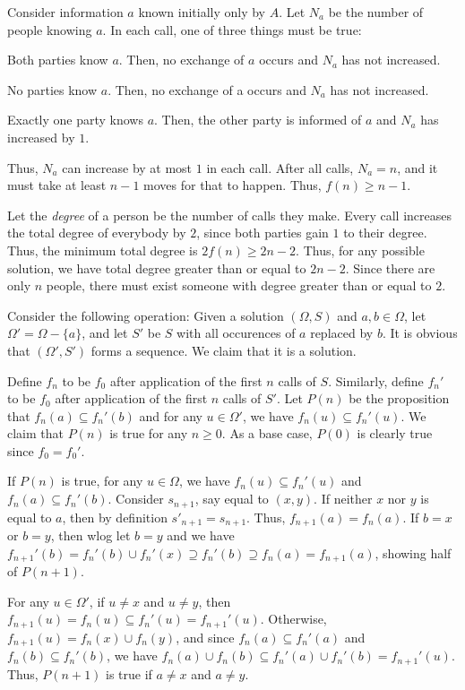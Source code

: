 \documentclass[12pt]{article}
\theoremstyle{customstyle}
\begin{document}
Consider information $a$ known initially only by $A$.
Let $N_a$ be the number of people knowing $a$.
In each call, one of three things must be true:
\begin{compactitem}
\item Both parties know $a$. 
    Then, no exchange of $a$ occurs and $N_a$ has not increased.
\item No parties know $a$. 
    Then, no exchange of a occurs and $N_a$ has not increased.
\item Exactly one party knows $a$.
    Then, the other party is informed of $a$ and $N_a$ has increased by $1$.
\end{compactitem}
Thus, $N_a$ can increase by at most $1$ in each call. 
After all calls, $N_a = n$, and it must take at least $n-1$ moves
for that to happen. Thus, $f(n) \ge n - 1$.

Let the \emph{degree} of a person be the number of calls they make.
Every call increases the total degree of everybody by $2$,
since both parties gain $1$ to their degree.
Thus, the minimum total degree is $2f(n) \ge 2n - 2$.
Thus, for any possible solution,
we have total degree greater than or equal to $2n - 2$.
Since there are only $n$ people, there must exist
someone with degree greater than or equal to $2$.

Consider the following operation: 
Given a solution $(\Omega, S)$ and $a,b \in \Omega$,
let $\Omega' = \Omega - \{a\}$, and
let $S'$ be $S$ with all occurences of $a$ replaced by $b$.
It is obvious that $(\Omega', S')$ forms a sequence.
We claim that it is a solution.

Define $f_n$ to be $f_{0}$ after application
of the first $n$ calls of $S$.
Similarly, define $f_n'$ to be $f_{0}$ after application
of the first $n$ calls of $S'$.
Let $P(n)$ be the proposition that 
$f_n(a) \subseteq f_n'(b)$ and
for any $u \in \Omega'$,
we have $f_n(u) \subseteq f_n'(u)$.
We claim that $P(n)$ is true for any $n \ge 0$.
As a base case, $P(0)$ is clearly true since $f_{0}=f_{0}'$.

If $P(n)$ is true, for any $u \in \Omega$, we have $f_n(u) \subseteq f_n'(u)$ and $f_n(a) \subseteq f_n'(b)$.
Consider $s _{n+1}$, say equal to $(x,y)$.
If neither $x$ nor $y$ is equal to $a$,
then by definition $s'_{n+1} = s_{n+1}$.
Thus, $f_{n+1}(a) = f_n(a)$.
If $b=x$ or $b=y$, then wlog let $b=y$ and we have
$f_{n+1}'(b) = f_{n}'(b) \cup f_n'(x) \supseteq f_n'(b) \supseteq f_n(a) = f_{n+1}(a)$, 
showing half of $P(n+1)$.

For any $u \in \Omega'$, if $u \ne x$ and $u \ne y$,
then $f_{n+1}(u) = f_n(u) \subseteq f_n'(u) = f_{n+1}'(u)$.
Otherwise, $f_{n+1}(u) = f_n(x) \cup f_n(y)$,
and since $f_n(a) \subseteq f_n'(a)$ and $f_n(b) \subseteq f_n'(b)$,
we have $f_n(a) \cup f_n(b) \subseteq f_n'(a) \cup f_n'(b) = f_{n+1}'(u)$.
Thus, $P(n+1)$ is true if $a \ne x$ and $a \ne y$.
\end{document}
